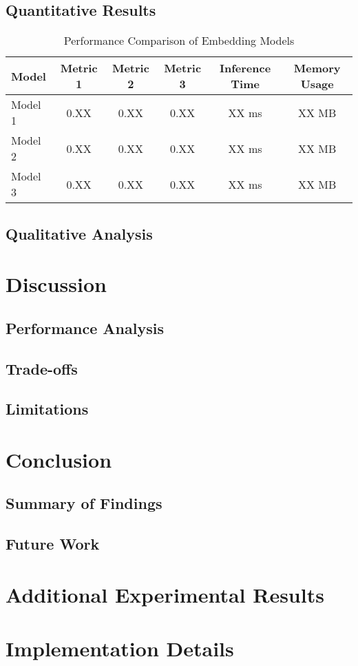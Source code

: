 \documentclass[12pt,a4paper]{article}
\begin{document}
\subsection{Quantitative Results}
\begin{table}[H]
    \centering
    \caption{Performance Comparison of Embedding Models}
    \begin{tabular}{lccccc}
        \toprule
        \textbf{Model} & \textbf{Metric 1} & \textbf{Metric 2} & \textbf{Metric 3} & \textbf{Inference Time} & \textbf{Memory Usage} \\
        \midrule
        Model 1 & 0.XX & 0.XX & 0.XX & XX ms & XX MB \\
        Model 2 & 0.XX & 0.XX & 0.XX & XX ms & XX MB \\
        Model 3 & 0.XX & 0.XX & 0.XX & XX ms & XX MB \\
        \bottomrule
    \end{tabular}
    \label{tab:results}
\end{table}

\subsection{Qualitative Analysis}

\section{Discussion}
\subsection{Performance Analysis}
\subsection{Trade-offs}
\subsection{Limitations}

\section{Conclusion}
\subsection{Summary of Findings}
\subsection{Future Work}




\appendix
\section{Additional Experimental Results}
\section{Implementation Details}
\end{document}
